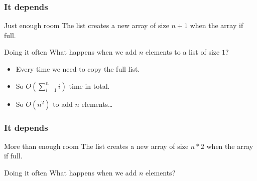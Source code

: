 \begin{frame}
	\frametitle{It depends}
	\begin{alertblock}{Just enough room}
		The list creates a new array of size $n+1$ when the array if full.
	\end{alertblock}	
	\begin{block}{Doing it often}
		What happens when we add $n$ elements to a list of size $1$?\\
		\begin{itemize}
			\item Every time we need to copy the full list.
			\item So $O(\sum\limits_{i=1}^{n}i)$ time in total.
			\item So $O(n^2)$ to add $n$ elements\dots
		\end{itemize}
	\end{block}	
\end{frame}

\begin{frame}
	\frametitle{It depends}
	\begin{answerblock}{More than enough room}
		The list creates a new array of size $n*2$ when the array if full.
	\end{answerblock}	
	\begin{block}{Doing it often}
		What happens when we add $n$ elements?
	\end{block}
\end{frame}

